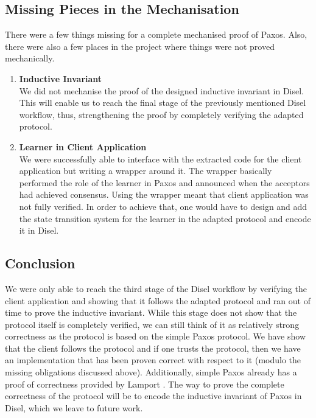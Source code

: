 \vspace{-5mm}
\subsection{Missing Pieces in the Mechanisation}
There were a few things missing for a complete mechanised proof of Paxos.
Also, there were also a few places in the project where things
were not proved mechanically.

\begin{enumerate}
  \item \textbf{Inductive Invariant} \\
    We did not mechanise the proof of the designed inductive invariant in Disel.
    This will enable us to reach the final stage of the previously mentioned Disel workflow,
    thus, strengthening the proof by completely verifying the adapted protocol.
  \item \textbf{Learner in Client Application} \\
    We were successfully able to interface with the extracted code for the client
    application but writing a wrapper around it. The wrapper basically performed
    the role of the learner in Paxos and announced when the acceptors had
    achieved consensus. Using the wrapper meant that client application was not
    fully verified. In order to achieve that, one would have to design and add the
    state transition system for the learner in the adapted protocol and encode it
    in Disel.
\end{enumerate}

\vspace{-5mm}
\subsection{Conclusion}
We were only able to reach the third stage of the Disel workflow by
verifying the client application and showing that it follows the
adapted protocol and ran out of time to prove the inductive invariant.
While this stage does not show that the protocol itself
is completely verified, we can still think of it as relatively strong
correctness as the protocol is based on the simple Paxos protocol.
We have show that the client follows the protocol and
if one trusts the protocol, then we have an implementation that has been proven correct
with respect to it (modulo the missing obligations discussed above).
Additionally, simple Paxos already has a proof of correctness provided by Lamport \cite{4}.
The way to prove the complete correctness of the protocol will be to encode the
inductive invariant of Paxos in Disel, which we leave to future work.

